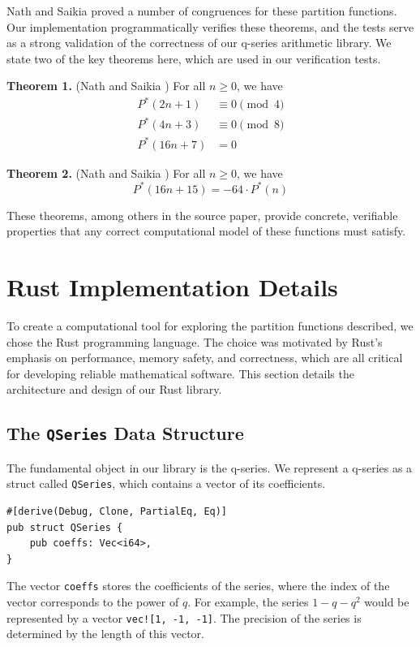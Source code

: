 \documentclass{article}
\begin{document}
Nath and Saikia proved a number of congruences for these partition functions. Our implementation programmatically verifies these theorems, and the tests serve as a strong validation of the correctness of our q-series arithmetic library. We state two of the key theorems here, which are used in our verification tests.

\textbf{Theorem 1.} (Nath and Saikia \cite{nath2025arithmetic}) For all $n \ge 0$, we have
\begin{align}
P^*(2n+1) &\equiv 0 \pmod{4} \\
P^*(4n+3) &\equiv 0 \pmod{8} \\
P^*(16n+7) &= 0
\end{align}

\textbf{Theorem 2.} (Nath and Saikia \cite{nath2025arithmetic}) For all $n \ge 0$, we have
\begin{equation}
P^*(16n+15) = -64 \cdot P^*(n)
\end{equation}

These theorems, among others in the source paper, provide concrete, verifiable properties that any correct computational model of these functions must satisfy.

\section{Rust Implementation Details}

To create a computational tool for exploring the partition functions described, we chose the Rust programming language. The choice was motivated by Rust's emphasis on performance, memory safety, and correctness, which are all critical for developing reliable mathematical software. This section details the architecture and design of our Rust library.

\subsection{The \texttt{QSeries} Data Structure}

The fundamental object in our library is the q-series. We represent a q-series as a struct called \texttt{QSeries}, which contains a vector of its coefficients.
\begin{verbatim}
#[derive(Debug, Clone, PartialEq, Eq)]
pub struct QSeries {
    pub coeffs: Vec<i64>,
}
\end{verbatim}
The vector \texttt{coeffs} stores the coefficients of the series, where the index of the vector corresponds to the power of $q$. For example, the series $1 - q - q^2$ would be represented by a vector \texttt{vec![1, -1, -1]}. The precision of the series is determined by the length of this vector.
\end{document}
